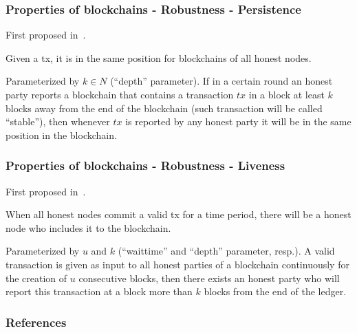 \documentclass{beamer}
\begin{document}
\begin{frame}
    \frametitle{Properties of blockchains - Robustness - Persistence}

    First proposed in~\cite{garay2015bitcoin}.

    Given a tx, it is in the same position for blockchains of all honest nodes.

    \begin{definition}[Persistence]
        Parameterized by $k \in N$ (``depth'' parameter). If in a certain round an honest party reports a blockchain that contains a transaction $tx$ in a block at least $k$ blocks away from the end of the blockchain (such transaction will be called ``stable''), then whenever $tx$ is reported by any honest party it will be in the same position in the blockchain.
    \end{definition}

\end{frame}


\begin{frame}
    \frametitle{Properties of blockchains - Robustness - Liveness}
        
    First proposed in~\cite{garay2015bitcoin}.

    When all honest nodes commit a valid tx for a time period, there will be a honest node who includes it to the blockchain.

    \begin{definition}[Liveness]
        Parameterized by $u$ and $k$ (``waittime'' and ``depth'' parameter, resp.). A valid transaction is given as input to all honest parties of a blockchain continuously for the creation of $u$ consecutive blocks, then there exists an honest party who will report this transaction at a block more than $k$ blocks from the end of the ledger.
    \end{definition}

\end{frame}


\begin{frame}[allowframebreaks]
    \frametitle{References}
    
    \tiny
\end{frame}
\end{document}

